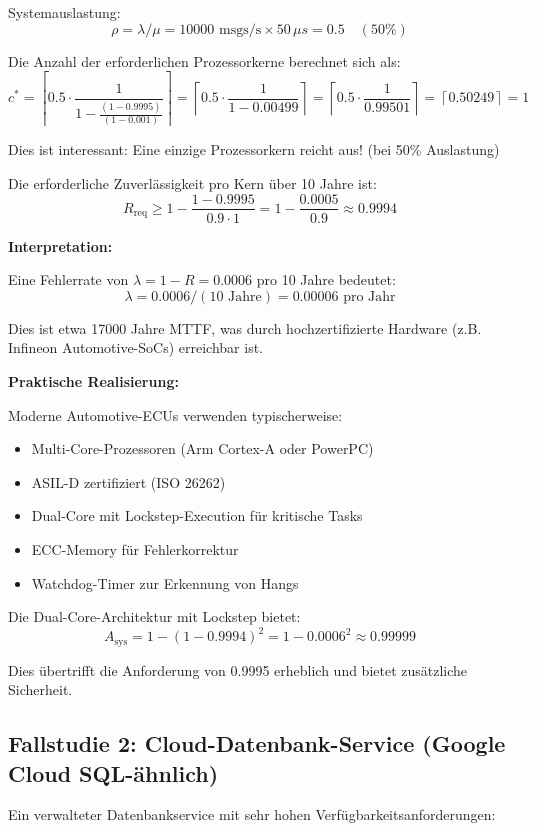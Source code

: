 \documentclass[a4paper,11pt]{article}
\theoremstyle{definition}
\begin{document}
Systemauslastung:
\[
    \rho = \lambda / \mu = 10000 \text{ msgs/s} \times 50 \, \mu s = 0.5 \quad (50\%)
\]

Die Anzahl der erforderlichen Prozessorkerne berechnet sich als:
\[
    c^* = \left\lceil 0.5 \cdot \frac{1}{1 - \frac{(1-0.9995)}{(1-0.001)}} \right\rceil
    = \left\lceil 0.5 \cdot \frac{1}{1 - 0.00499} \right\rceil
    = \left\lceil 0.5 \cdot \frac{1}{0.99501} \right\rceil
    = \left\lceil 0.50249 \right\rceil = 1
\]

Dies ist interessant: Eine einzige Prozessorkern reicht aus! (bei 50\% Auslastung)

Die erforderliche Zuverlässigkeit pro Kern über 10 Jahre ist:
\[
    R_{\text{req}} \geq 1 - \frac{1 - 0.9995}{0.9 \cdot 1} = 1 - \frac{0.0005}{0.9} \approx 0.9994
\]

\textbf{Interpretation:}

Eine Fehlerrate von $\lambda = 1 - R = 0.0006$ pro 10 Jahre bedeutet:
\[
    \lambda = 0.0006 / (10 \text{ Jahre}) = 0.00006 \text{ pro Jahr}
\]

Dies ist etwa 17000 Jahre MTTF, was durch hochzertifizierte Hardware (z.B. Infineon Automotive-SoCs) 
erreichbar ist.

\textbf{Praktische Realisierung:}

Moderne Automotive-ECUs verwenden typischerweise:
\begin{itemize}
    \item Multi-Core-Prozessoren (Arm Cortex-A oder PowerPC)
    \item ASIL-D zertifiziert (ISO 26262)
    \item Dual-Core mit Lockstep-Execution für kritische Tasks
    \item ECC-Memory für Fehlerkorrektur
    \item Watchdog-Timer zur Erkennung von Hangs
\end{itemize}

Die Dual-Core-Architektur mit Lockstep bietet:
\[
    A_{\text{sys}} = 1 - (1 - 0.9994)^2 = 1 - 0.0006^2 \approx 0.99999
\]

Dies übertrifft die Anforderung von 0.9995 erheblich und bietet zusätzliche Sicherheit.

\subsection{Fallstudie 2: Cloud-Datenbank-Service (Google Cloud SQL-ähnlich)}

Ein verwalteter Datenbankservice mit sehr hohen Verfügbarkeitsanforderungen:
\end{document}
